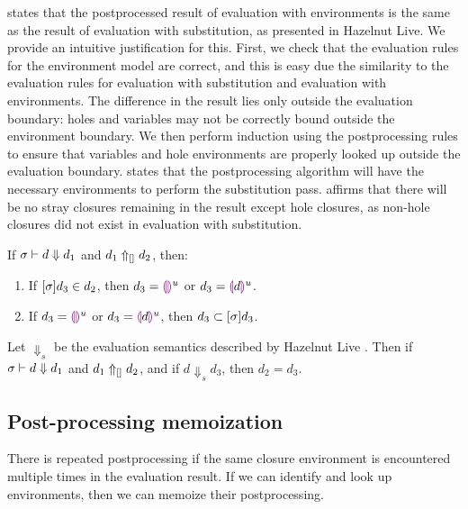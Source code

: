  states that the postprocessed result of evaluation with environments is the same as the result of evaluation with substitution, as presented in Hazelnut Live. We provide an intuitive justification for this. First, we check that the evaluation rules for the environment model are correct, and this is easy due the similarity to the evaluation rules for evaluation with substitution and evaluation with environments. The difference in the result lies only outside the evaluation boundary: holes and variables may not be correctly bound outside the environment boundary. We then perform induction using the postprocessing rules to ensure that variables and hole environments are properly looked up outside the evaluation boundary.  states that the postprocessing algorithm will have the necessary environments to perform the substitution pass.  affirms that there will be no stray closures remaining in the result except hole closures, as non-hole closures did not exist in evaluation with substitution.

\begin{theorem}
  If $\sigma\vdash d\Downarrow d_1$ and $d_1\Uparrow_{[]} d_2$, then:
  \begin{enumerate}
  \item If $[\sigma]d_3\in d_2$, then $d_3=\textcolor{violet}{\llparenthesis}\textcolor{violet}{\rrparenthesis}^u$ or $d_3=\textcolor{violet}{\llparenthesis} d\textcolor{violet}{\rrparenthesis}^u$.
  \item If $d_3=\textcolor{violet}{\llparenthesis}\textcolor{violet}{\rrparenthesis}^u$ or $d_3=\textcolor{violet}{\llparenthesis} d\textcolor{violet}{\rrparenthesis}^u$, then $d_3\subset[\sigma]d_3$.
  \end{enumerate}
  \label{thm:substitution-postprocessing}
\end{theorem}

\begin{theorem}
  Let $\Downarrow_s$ be the evaluation semantics described by Hazelnut Live \cite{conf/popl/HazelnutLive19}. Then if $\sigma\vdash d\Downarrow d_1$ and $d_1\Uparrow_{[]} d_2$, and if $d\Downarrow_s d_3$, then $d_2=d_3$.
  \label{thm:eval-correctness}
\end{theorem}

\subsection{Post-processing memoization}
\label{sec:memoization}

There is repeated postprocessing if the same closure environment is encountered multiple times in the evaluation result. If we can identify and look up environments, then we can memoize their postprocessing.

